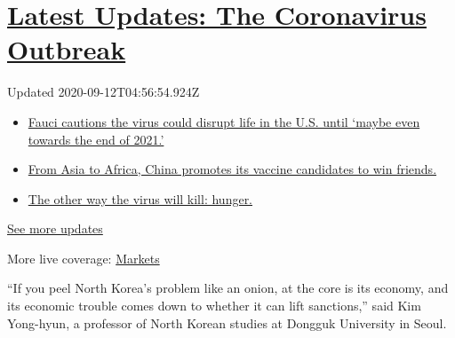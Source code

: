 \hypertarget{latest-updates-the-coronavirus-outbreak}{%
\section{\texorpdfstring{\href{https://www.nytimes3xbfgragh.onion/2020/09/11/world/covid-19-coronavirus.html?action=click\&pgtype=Article\&state=default\&region=MAIN_CONTENT_1\&context=storylines_live_updates}{Latest
Updates: The Coronavirus
Outbreak}}{Latest Updates: The Coronavirus Outbreak}}\label{latest-updates-the-coronavirus-outbreak}}

Updated 2020-09-12T04:56:54.924Z

\begin{itemize}
\tightlist
\item
  \href{https://www.nytimes3xbfgragh.onion/2020/09/11/world/covid-19-coronavirus.html?action=click\&pgtype=Article\&state=default\&region=MAIN_CONTENT_1\&context=storylines_live_updates\#link-dfb8a16}{Fauci
  cautions the virus could disrupt life in the U.S. until `maybe even
  towards the end of 2021.'}
\item
  \href{https://www.nytimes3xbfgragh.onion/2020/09/11/world/covid-19-coronavirus.html?action=click\&pgtype=Article\&state=default\&region=MAIN_CONTENT_1\&context=storylines_live_updates\#link-7104d154}{From
  Asia to Africa, China promotes its vaccine candidates to win friends.}
\item
  \href{https://www.nytimes3xbfgragh.onion/2020/09/11/world/covid-19-coronavirus.html?action=click\&pgtype=Article\&state=default\&region=MAIN_CONTENT_1\&context=storylines_live_updates\#link-393ad215}{The
  other way the virus will kill: hunger.}
\end{itemize}

\href{https://www.nytimes3xbfgragh.onion/2020/09/11/world/covid-19-coronavirus.html?action=click\&pgtype=Article\&state=default\&region=MAIN_CONTENT_1\&context=storylines_live_updates}{See
more updates}

More live coverage:
\href{https://www.nytimes3xbfgragh.onion/live/2020/09/11/business/stock-market-today-coronavirus?action=click\&pgtype=Article\&state=default\&region=MAIN_CONTENT_1\&context=storylines_live_updates}{Markets}

``If you peel North Korea's problem like an onion, at the core is its
economy, and its economic trouble comes down to whether it can lift
sanctions,'' said Kim Yong-hyun, a professor of North Korean studies at
Dongguk University in Seoul.

